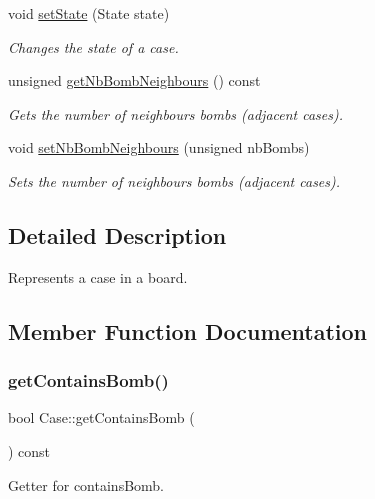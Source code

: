 \begin{DoxyCompactItemize}
void \hyperlink{class_case_a4c6f440f1cf6c24cc33be445cc5aad45}{set\+State} (State state)
\begin{DoxyCompactList}\small\item\em Changes the state of a case. \end{DoxyCompactList}\item 
unsigned \hyperlink{class_case_ae6f3c6f3b725214d0c7db8661f7a7816}{get\+Nb\+Bomb\+Neighbours} () const
\begin{DoxyCompactList}\small\item\em Gets the number of neighbours bombs (adjacent cases). \end{DoxyCompactList}\item 
\mbox{\label{class_case_a1a99948b78ed3c5589d821ca3221f034}} 
void \hyperlink{class_case_a1a99948b78ed3c5589d821ca3221f034}{set\+Nb\+Bomb\+Neighbours} (unsigned nb\+Bombs)
\begin{DoxyCompactList}\small\item\em Sets the number of neighbours bombs (adjacent cases). \end{DoxyCompactList}\end{DoxyCompactItemize}


\subsection{Detailed Description}
Represents a case in a board. 

\subsection{Member Function Documentation}
\mbox{\label{class_case_ab776d3e52ca8b9183e20cc301cfa062f}} 
\subsubsection{\texorpdfstring{get\+Contains\+Bomb()}{getContainsBomb()}}
{\footnotesize\ttfamily bool Case\+::get\+Contains\+Bomb (\begin{DoxyParamCaption}{ }\end{DoxyParamCaption}) const\hspace{0.3cm}{\ttfamily [inline]}}



Getter for contains\+Bomb. 


